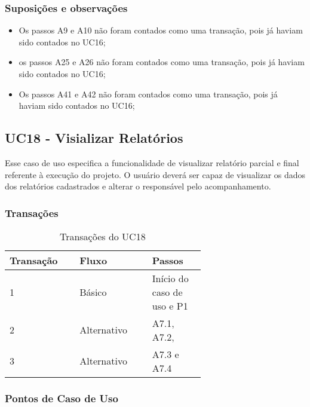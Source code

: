   \subsubsection{Suposições e observações}
  
  \begin{itemize}
   \item Os passos A9 e A10 não foram contados como uma transação, pois já haviam sido contados no UC16;	
   \item os passos A25 e A26 não foram contados como uma transação, pois já haviam sido contados no UC16;	
   \item Os passos A41 e A42 não foram contados como uma transação, pois já haviam sido contados no UC16;
  \end{itemize}
  
  \vfill
  
  
  
  \pagebreak
\subsection{UC18 - Visializar Relatórios}
  
  Esse caso de uso especifica a funcionalidade de visualizar relatório parcial e final referente à execução do projeto.
  O usuário deverá ser capaz de visualizar os dados dos relatórios cadastrados e alterar o responsável pelo acompanhamento.

  \subsubsection{Transações}

  \begin{table*}[!h]
  \centering
  \caption{Transações do UC18}
  \label{uc17_transactions}
    \begin{tabular}{|p{0.20\linewidth}|p{0.25\linewidth}|p{0.20\linewidth}|}
    \hline
    \textbf{Transação} & \textbf{Fluxo} & \textbf{Passos} \\ 
    \hline
    1 & Básico & Início do caso de uso e P1\\
    \hline
    2 & Alternativo & A7.1, A7.2, \\
    \hline
    3 & Alternativo & A7.3 e A7.4\\
    \hline
    \end{tabular}
  \end{table*}

  \subsubsection{Pontos de Caso de Uso}

